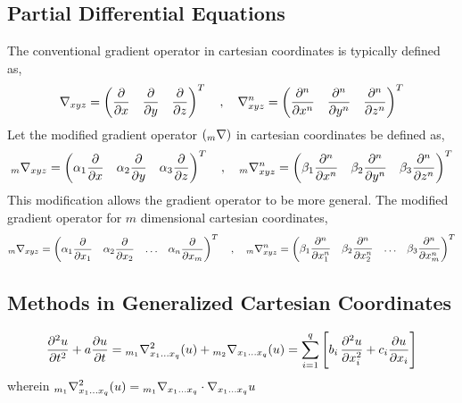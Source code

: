 \documentclass[class=report, 12pt, crop=false]{standalone}
\begin{document}
\begin{center}

\chapter{Partial Differential Equations}
\begin{comment}
Currently, only discussions of the Sturm -Liouville, the other applications are placed elsewhere, such as Physics Archives or Fluid Archives
modified gradient operators need to be revised very closely!!!!!!
\end{comment}
The conventional gradient operator in cartesian coordinates is typically defined as,
$$\nabla_{xyz} = \begin{pmatrix}\displaystyle{\frac{\partial}{\partial x}} & \displaystyle{\frac{\partial}{\partial y}} & \displaystyle{\frac{\partial}{\partial z}}\end{pmatrix}^T\quad,\quad \nabla^n_{xyz} = \begin{pmatrix}\displaystyle{\frac{\partial^n}{\partial x^n}} & \displaystyle{\frac{\partial^n}{\partial y^n}} & \displaystyle{\frac{\partial^n}{\partial z^n}}\end{pmatrix}^T$$
Let the modified gradient operator $\displaystyle{({}_{m}\nabla)}$ in cartesian coordinates be defined as,
$${}_{m}\nabla_{xyz} = \begin{pmatrix}\displaystyle{\alpha_1\frac{\partial}{\partial x}} & \displaystyle{\alpha_2\frac{\partial}{\partial y}} & \displaystyle{\alpha_3\frac{\partial}{\partial z}}\end{pmatrix}^T\quad,\quad {}_{m}\nabla^n_{xyz} = \begin{pmatrix}\displaystyle{\beta_1\frac{\partial^n}{\partial x^n}} & \displaystyle{\beta_2\frac{\partial^n}{\partial y^n}} & \displaystyle{\beta_3\frac{\partial^n}{\partial z^n}}\end{pmatrix}^T$$
This modification allows the gradient operator to be more general. The modified gradient operator for $m$ dimensional cartesian coordinates,
$${}_{m}\nabla_{xyz} = \begin{pmatrix}\displaystyle{\alpha_1\frac{\partial}{\partial x_1}} & \displaystyle{\alpha_2\frac{\partial}{\partial x_2}} & \dots & \displaystyle{\alpha_n\frac{\partial}{\partial x_m}}\end{pmatrix}^T\quad,\quad {}_{m}\nabla^n_{xyz} = \begin{pmatrix}\displaystyle{\beta_1\frac{\partial^n}{\partial x_1^n}} & \displaystyle{\beta_2\frac{\partial^n}{\partial x_2^n}} & \dots & \displaystyle{\beta_3\frac{\partial^n}{\partial x_m^n}}\end{pmatrix}^T$$
\section{Methods in Generalized Cartesian Coordinates}
\begin{comment}
Massive Fault in Theoretical Understanding. IN NEED OF EXTREME REVISION
\end{comment}
$$\frac{\partial^2u}{\partial t^2} + a\frac{\partial u}{\partial t} = {}_{m_1}\nabla^2_{x_1\dots x_q}(u) + {}_{m_2}\nabla_{x_1\dots x_q}(u) = \sum^{q}_{i=1}\left[b_i\,\frac{\partial^2u}{\partial x^2_{i}} + c_i\frac{\partial u}{\partial x_{i}}\right]$$
wherein $\displaystyle{{}_{m_1}\nabla^2_{x_1\dots x_q}(u) = {}_{m_1}\nabla_{x_1\dots x_q} \cdot\nabla_{x_1\dots x_q}u}$

\end{center}
\end{document}
